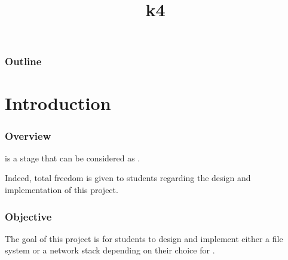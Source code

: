 %
%
%
%
%
%

%
%

%
%

\def\path{../../..}

%
%



%
%

\title{k4}

%
%



%
%

\begin{frame}
  \titlepage
\end{frame}

%
%

\begin{frame}
  \frametitle{Outline}

  \tableofcontents
\end{frame}

%
%

%
%

\section{Introduction}


\begin{frame}
  \frametitle{Overview}

   is a stage that can be considered as .

  \-

  Indeed, total freedom is given to students regarding the design and
  implementation of this project.
\end{frame}


\begin{frame}
  \frametitle{Objective}

  The goal of this project is for students to design and implement either a
  file system or a network stack depending on their choice for .
\end{frame}

